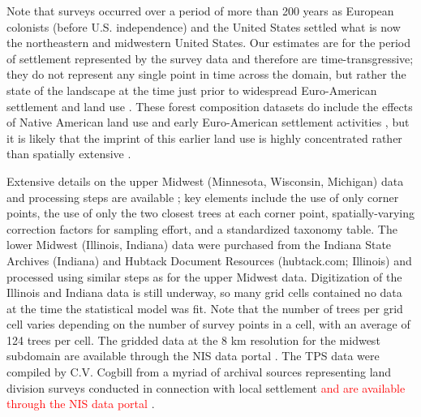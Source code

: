 \documentclass[12pt]{article}\usepackage[]{graphicx}\usepackage[]{color}
\begin{document}
Note that surveys occurred over a period of more than 200 years as
European colonists (before U.S. independence) and the United States
settled what is now the northeastern and midwestern United States.
Our estimates are for the period of settlement represented by the
survey data and therefore are time-transgressive; they do not represent
any single point in time across the domain, but rather the state of
the landscape at the time just prior to widespread Euro-American settlement
and land use \citep{Whit:1996,Cogb:etal:2002}. These forest composition
datasets do include the effects of Native American land use and early
Euro-American settlement activities \citep[e.g.,][]{Blac:etal:2006},
but it is likely that the imprint of this earlier land use is highly
concentrated rather than spatially extensive \citep{munoz2014defining}.

Extensive details on the upper Midwest (Minnesota, Wisconsin, Michigan)
data and processing steps are available \cite{goring2015composition};
key elements include the use of only corner points, the use of only
the two closest trees at each corner point, spatially-varying correction
factors for sampling effort, and a standardized taxonomy table. The
lower Midwest (Illinois, Indiana) data were purchased from the Indiana
State Archives (Indiana) and Hubtack Document Resources (hubtack.com;
Illinois) and processed using similar steps as for the upper Midwest
data. Digitization of the Illinois and Indiana data is still underway,
so many grid cells contained no data at the time the statistical model
was fit. Note that the number of trees per grid cell varies depending
on the number of survey points in a cell, with an average of 124 trees
per cell. The gridded data at the 8 km resolution for the midwest
subdomain are available through the NIS data portal \textcolor{red}{\citep{Gori:etal:data:2016}}.
The TPS data were compiled by C.V. Cogbill from a myriad of archival
sources representing land division surveys conducted in connection
with local settlement\textcolor{red}{{} and are available through the
NIS data portal \citep{Cogb:dataNE:2016,Cogb:dataOH:2016}}. 
\end{document}
